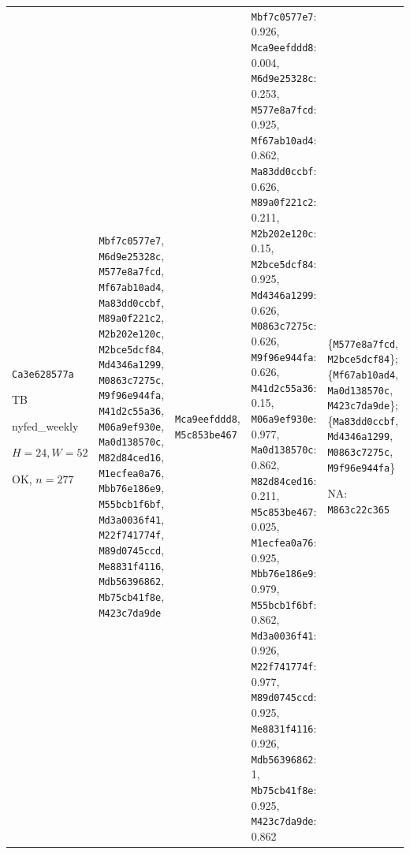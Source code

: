 \begin{longtable}{p{.15\linewidth}p{.17\linewidth}p{.17\linewidth}p{.25\linewidth}p{.14\linewidth}}
\texttt{Ca3e628577a}\par TB\par nyfed\_\allowbreak{}weekly\par $H=24,W=52$\par OK, $n=277$ & \texttt{Mbf7c0577e7}, \texttt{M6d9e25328c}, \texttt{M577e8a7fcd}, \texttt{Mf67ab10ad4}, \texttt{Ma83dd0ccbf}, \texttt{M89a0f221c2}, \texttt{M2b202e120c}, \texttt{M2bce5dcf84}, \texttt{Md4346a1299}, \texttt{M0863c7275c}, \texttt{M9f96e944fa}, \texttt{M41d2c55a36}, \texttt{M06a9ef930e}, \texttt{Ma0d138570c}, \texttt{M82d84ced16}, \texttt{M1ecfea0a76}, \texttt{Mbb76e186e9}, \texttt{M55bcb1f6bf}, \texttt{Md3a0036f41}, \texttt{M22f741774f}, \texttt{M89d0745ccd}, \texttt{Me8831f4116}, \texttt{Mdb56396862}, \texttt{Mb75cb41f8e}, \texttt{M423c7da9de} & \texttt{Mca9eefddd8}, \texttt{M5c853be467} & \texttt{Mbf7c0577e7}: 0.926, \texttt{Mca9eefddd8}: 0.004, \texttt{M6d9e25328c}: 0.253, \texttt{M577e8a7fcd}: 0.925, \texttt{Mf67ab10ad4}: 0.862, \texttt{Ma83dd0ccbf}: 0.626, \texttt{M89a0f221c2}: 0.211, \texttt{M2b202e120c}: 0.15, \texttt{M2bce5dcf84}: 0.925, \texttt{Md4346a1299}: 0.626, \texttt{M0863c7275c}: 0.626, \texttt{M9f96e944fa}: 0.626, \texttt{M41d2c55a36}: 0.15, \texttt{M06a9ef930e}: 0.977, \texttt{Ma0d138570c}: 0.862, \texttt{M82d84ced16}: 0.211, \texttt{M5c853be467}: 0.025, \texttt{M1ecfea0a76}: 0.925, \texttt{Mbb76e186e9}: 0.979, \texttt{M55bcb1f6bf}: 0.862, \texttt{Md3a0036f41}: 0.926, \texttt{M22f741774f}: 0.977, \texttt{M89d0745ccd}: 0.925, \texttt{Me8831f4116}: 0.926, \texttt{Mdb56396862}: 1, \texttt{Mb75cb41f8e}: 0.925, \texttt{M423c7da9de}: 0.862 & \{\texttt{M577e8a7fcd}, \texttt{M2bce5dcf84}\}; \{\texttt{Mf67ab10ad4}, \texttt{Ma0d138570c}, \texttt{M423c7da9de}\}; \{\texttt{Ma83dd0ccbf}, \texttt{Md4346a1299}, \texttt{M0863c7275c}, \texttt{M9f96e944fa}\}\par NA: \texttt{M863c22c365} \\

\end{longtable}

